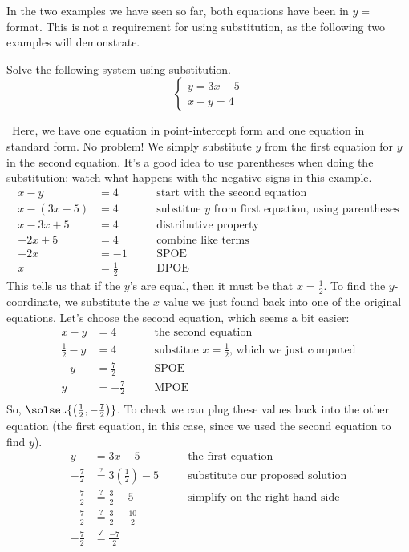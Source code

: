 In the two examples we have seen so far, both equations have been in $y=$ format. This is not a requirement for using substitution, as the following two examples will demonstrate.

\begin{boxex}
Solve the following system using substitution.
\[
\left\{%
\begin{array}{l}
y=3x-5\\
x-y=4
\end{array}
\right.
\] 

\exsoln\ Here, we have one equation in point-intercept form and one equation in standard form. No problem! We simply substitute $y$ from the first equation for $y$ in the second equation. It's a good idea to use parentheses when doing the substitution: watch what happens with the negative signs in this example.
\[\begin{aligned}
x-y &= 4
&& \quad\text{start with the second equation}\\
x-(3x-5) &= 4
&& \quad\text{substitue $y$ from first equation, using parentheses}\\
x - 3x + 5 &= 4
&& \quad\text{distributive property}\\
-2x + 5 &= 4
&& \quad\text{combine like terms}\\
-2x &= -1
&& \quad\text{SPOE}\\[1ex]
x &= \frac{1}{2}
&& \quad\text{DPOE}
\end{aligned}\]
This tells us that if the $y$'s are equal, then it must be that $x=\frac{1}{2}$. To find the $y$-coordinate, we substitute the $x$ value we just found back into one of the original equations. Let's choose the second equation, which seems a bit easier:
\[\begin{aligned}
x-y &= 4
&& \quad\text{the second equation}\\[1ex]
\frac{1}{2}-y &= 4
&& \quad\text{substitue $x = \tfrac{1}{2}$, which we just computed}\\[1ex]
-y &= \frac{7}{2}
&& \quad\text{SPOE}\\
y &= -\frac{7}{2}
&& \quad\text{MPOE}\\
\end{aligned}\]
So, $\solset{\left(\frac{1}{2}, -\frac{7}{2}\right)}$. To check we can plug these values back into the other equation (the first equation, in this case, since we used the second equation to find $y$).
\[\begin{aligned}
y &= 3x-5
&& \quad\text{the first equation}\\[1ex]
-\frac{7}{2} &\overset{?}{=} 3\left(\frac{1}{2}\right)-5
&& \quad\text{substitute our proposed solution}\\[1ex]
-\frac{7}{2} &\overset{?}{=} \frac{3}{2}-5
&& \quad\text{simplify on the right-hand side}\\[1ex]
-\frac{7}{2} &\overset{?}{=} \frac{3}{2}-\frac{10}{2}
&& \quad\text{}\\[1ex]
-\frac{7}{2} &\overset{\checkmark}{=} \frac{-7}{2}
&& \quad\text{}
\end{aligned}\]
\end{boxex}

